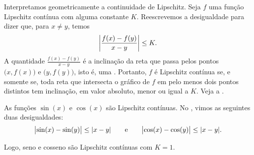 Interpretamos geometricamente a continuidade de Lipschitz. Seja $f$ uma função
Lipschitz contínua com alguma constante $K$. Reescrevemos a desigualdade
para dizer que, para $x \neq y$, temos
\begin{equation*}
\left\lvert {\frac{f(x)-f(y)}{x-y}} \right\rvert \leq K .
\end{equation*}
A quantidade $\frac{f(x)-f(y)}{x-y}$ é a inclinação da reta que passa pelos
pontos $\bigl(x,f(x)\bigr)$ e $\bigl(y,f(y)\bigr)$, isto é, uma
\emph{}. Portanto, $f$ é Lipschitz contínua se, e
somente se, toda reta que intersecta o gráfico de $f$ em pelo menos dois
pontos distintos tem inclinação, em valor absoluto, menor ou igual a $K$.
Veja a .
\begin{myfigureht}
\caption{A inclinação de uma reta secante.
Uma função é Lipschitz se %
$\abs{\frac{f(x)-f(y)}{x-y}} \leq K$ para todos $x$ e $y$. \label{fig:lipschitz}}
\end{myfigureht}

\begin{example}
As funções $\sin(x)$ e $\cos(x)$ são Lipschitz contínuas.
No , vimos as seguintes duas desigualdades:
\begin{equation*}
\bigl\lvert {\sin(x)-\sin(y)} \bigr\rvert
\leq \lvert {x-y} \rvert
\qquad \text{e} \qquad
\bigl\lvert {\cos(x)-\cos(y)} \bigr\rvert
\leq \lvert {x-y} \rvert .
\end{equation*}

Logo, seno e cosseno são Lipschitz contínuas com $K=1$.
\end{example}

